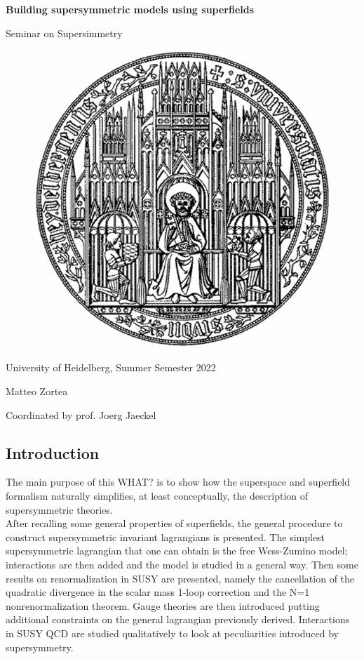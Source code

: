 \documentclass[12pt]{article}
\begin{document}
\centerline{\Large\bfseries Building supersymmetric models using superfields}
\vspace{5pt}
\centerline{\large Seminar on Supersimmetry}

\vspace{50pt}

\begin{figure}[h]
  \centering 
  \includegraphics[scale=0.45]{images/uniheilogo.png}
\end{figure}

\vspace{50pt}

\centerline{University of Heidelberg, Summer Semester 2022}
\vspace{5pt}
\centerline{Matteo Zortea}
\vspace{5pt}
\centerline{Coordinated by prof. Joerg Jaeckel}

\newpage
\subsection*{Introduction}
The main purpose of this WHAT? is to show how the superspace and superfield formalism naturally simplifies, at least conceptually, the description of supersymmetric theories. \\
After recalling some general properties of superfields, the general procedure to construct supersymmetric invariant lagrangians is presented. The simplest supersymmetric lagrangian that one can obtain is the free Wess-Zumino model; interactions are then added and the model is studied in a general way. 
Then some results on renormalization in SUSY are presented, namely the cancellation of the quadratic divergence in the scalar mass 1-loop correction and the N=1 nonrenormalization theorem. Gauge theories are then introduced putting additional
constraints on the general lagrangian previously derived. Interactions in SUSY QCD are studied qualitatively to look at peculiarities introduced by supersymmetry.
\end{document}
